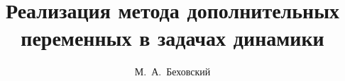 
\usepackage{iftex}

\ifPDFTeX
\usepackage[T2A]{fontenc}
\usepackage[utf8]{inputenc} %
\usepackage[english,russian]{babel}
\fi

\usepackage{todonotes} 

\usepackage[russian]{nla}


\fi

\title{Реализация метода дополнительных переменных в задачах динамики}
\author{М.~А.~Беховский}


\maketitle

